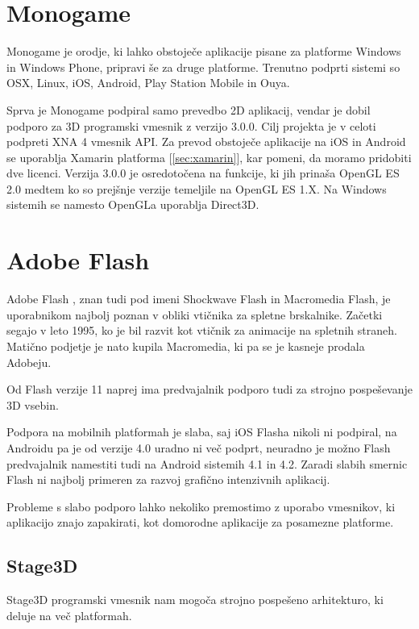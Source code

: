 \section{Monogame}

Monogame je orodje, ki lahko obstoječe aplikacije pisane za platforme Windows in Windows Phone, pripravi še za druge platforme. Trenutno podprti sistemi so OSX, Linux, iOS, Android, Play Station Mobile in Ouya. 

Sprva je Monogame podpiral samo prevedbo 2D aplikacij, vendar je dobil podporo za 3D programski vmesnik z verzijo 3.0.0. Cilj projekta je v celoti podpreti XNA 4 vmesnik API. Za prevod obstoječe aplikacije na iOS in Android se uporablja Xamarin platforma [\ref{sec:xamarin}], kar pomeni, da moramo pridobiti dve licenci. Verzija 3.0.0 je osredotočena na funkcije, ki jih prinaša OpenGL ES 2.0 medtem ko so prejšnje verzije temeljile na OpenGL ES 1.X. Na Windows sistemih se namesto OpenGLa uporablja Direct3D.

\section{Adobe Flash}

Adobe Flash \cite{flash}, znan tudi pod imeni Shockwave Flash in Macromedia Flash, je uporabnikom najbolj poznan v obliki vtičnika za spletne brskalnike. Začetki segajo v leto 1995, ko je bil razvit kot vtičnik za animacije na spletnih straneh. Matično podjetje je nato kupila Macromedia, ki pa se je kasneje prodala Adobeju.   

Od Flash verzije 11 naprej ima predvajalnik podporo tudi za strojno pospeševanje 3D vsebin.

Podpora na mobilnih platformah je slaba, saj iOS Flasha nikoli ni podpiral, na Androidu pa je od verzije 4.0 uradno ni več podprt, neuradno je možno Flash predvajalnik namestiti tudi na Android sistemih 4.1 in 4.2. Zaradi slabih smernic Flash ni najbolj primeren za razvoj grafično intenzivnih aplikacij.

Probleme s slabo podporo lahko nekoliko premostimo z uporabo vmesnikov, ki aplikacijo znajo zapakirati, kot domorodne aplikacije za posamezne platforme.

\subsection{Stage3D}

Stage3D programski vmesnik nam mogoča strojno pospešeno arhitekturo, ki deluje na več platformah. 

